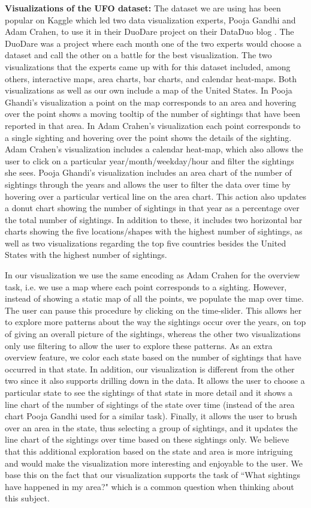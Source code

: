 \documentclass[journal]{vgtc}                %
\begin{document}
\textbf{Visualizations of the UFO dataset:}
The dataset we are using has been popular on Kaggle which led two data visualization experts, Pooja Gandhi and Adam Crahen, to use it in their DuoDare project on their DataDuo blog \cite{dataduo}. The DuoDare was a project where each month one of the two experts would choose a dataset and call the other on a battle for the best visualization. The two visualizations that the experts came up with for this dataset included, among others, interactive maps, area charts, bar charts, and calendar heat-maps. Both visualizations as well as our own include a map of the United States. In Pooja Ghandi's visualization a point on the map corresponds to an area and hovering over the point shows a moving tooltip of the number of sightings that have been reported in that area. In Adam Crahen's visualization each point corresponds to a single sighting and hovering over the point shows the details of the sighting. Adam Crahen's visualization includes a calendar heat-map, which also allows the user to click on a particular year/month/weekday/hour and filter the sightings she sees. Pooja Ghandi's visualization includes an area chart of the number of sightings through the years and allows the user to filter the data over time by hovering over a particular vertical line on the area chart. This action also updates a donut chart showing the number of sightings in that year as a percentage over the total number of sightings. In addition to these, it includes two horizontal bar charts showing the five locations/shapes with the highest number of sightings, as well as two visualizations regarding the top five countries besides the United States with the highest number of sightings. 

In our visualization we use the same encoding as Adam Crahen for the overview task, i.e. we use a map where each point corresponds to a sighting. However, instead of showing a static map of all the points, we populate the map over time. The user can pause this procedure by clicking on the time-slider. This allows her to explore more patterns about the way the sightings occur over the years, on top of giving an overall picture of the sightings, whereas the other two visualizations only use filtering to allow the user to explore these patterns. As an extra overview feature, we color each state based on the number of sightings that have occurred in that state. In addition, our visualization is different from the other two since it also supports drilling down in the data. It allows the user to choose a particular state to see the sightings of that state in more detail and it shows a line chart of the number of sightings of the state over time (instead of the area chart Pooja Gandhi used for a similar task). Finally, it allows the user to brush over an area in the state, thus selecting a group of sightings, and it updates the line chart of the sightings over time based on these sightings only. We believe that this additional exploration based on the state and area is more intriguing and would make the visualization more interesting and enjoyable to the user. We base this on the fact that our visualization supports the task of ``What sightings have happened in my area?" which is a common question when thinking about this subject.
\end{document}

